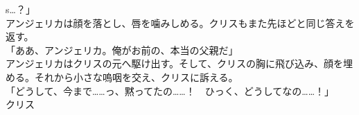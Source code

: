 \documentclass[b5j,10pt,openany]{jsbook}
\begin{document}
s{}\ldots{}？」\\アンジェリカは顔を落とし、唇を噛みしめる。クリスもまた先ほどと同じ答えを返す。\\「ああ、アンジェリカ。俺がお前の、本当の父親だ」\\アンジェリカはクリスの元へ駆け出す。そして、クリスの胸に飛び込み、顔を埋める。それから小さな嗚咽を交え、クリスに訴える。\\「どうして、今まで\ldots{}\ldots{}っ、黙ってたの\ldots{}\ldots{}！　ひっく、どうしてなの\ldots{}\ldots{}！」\\クリス
\end{document}
